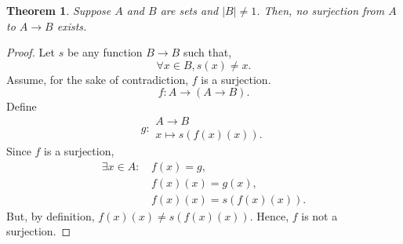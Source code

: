 \documentclass{article}
\begin{document}
\newtheorem{theorem}{Theorem}
\begin{theorem}
  Suppose $A$ and $B$ are sets and $|B| \neq 1$. Then, no surjection from $A$ to $A \to B$ exists.
\end{theorem}
\begin{proof}
  Let $s$ be any function $B \to B$ such that,
  \begin{equation*}
    \forall x \in B, s(x) \neq x.
  \end{equation*}
  Assume, for the sake of contradiction, $f$ is a surjection.
  \begin{equation*}
    f : A \to (A \to B).
  \end{equation*}
  Define
  \begin{equation*}
    g: \begin{array}{l} A  \to B \\ x \mapsto s(f(x)(x)). \end{array}
  \end{equation*}
  Since $f$ is a surjection,
  \begin{align*}
    \exists x \in A :\, & f(x) = g, \\
                        & f(x)(x) = g(x), \\
                        & f(x)(x) = s(f(x)(x)).
  \end{align*}
  But, by definition, $f(x)(x) \neq s(f(x)(x))$. Hence, $f$ is not a surjection.
\end{proof}
\end{document}
